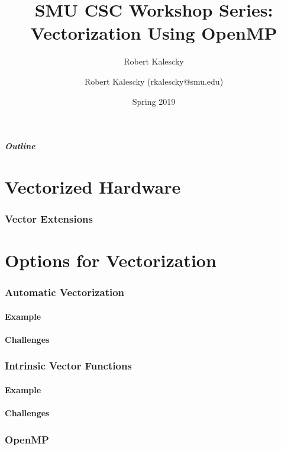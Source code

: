 \documentclass{beamer}
\title{SMU CSC Workshop Series: Vectorization Using OpenMP}
\author{Robert Kalescky}
\date{Spring 2019}
\author{Robert Kalescky (rkalescky@smu.edu)}
\begin{document}
\begin{frame}
\titlepage
\end{frame}

\begin{frame}
\frametitle{Outline}
\tableofcontents
\end{frame}



\part{Vectorized Hardware}

\section{Vector Extensions}

\part{Options for Vectorization}

\section{Automatic Vectorization}

\subsection{Example}

\subsection{Challenges}

\section{Intrinsic Vector Functions}

\subsection{Example}

\subsection{Challenges}

\section{OpenMP}
\end{document}
